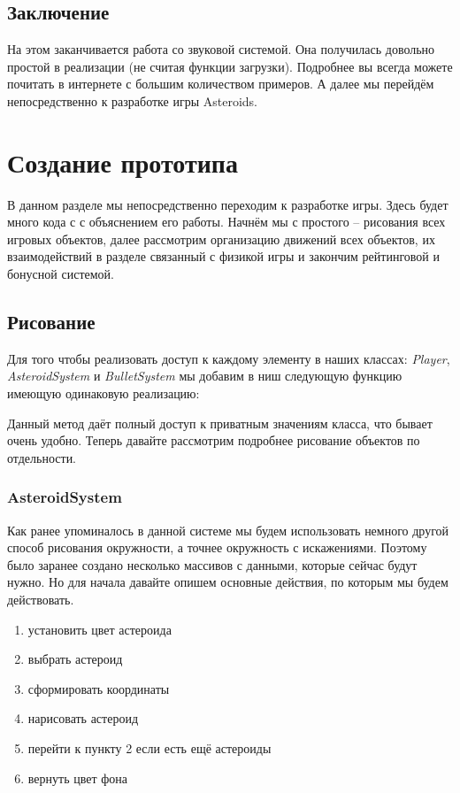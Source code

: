 \section{Заключение}
На этом заканчивается работа со звуковой системой. Она получилась довольно простой в 
реализации (не считая функции загрузки). Подробнее вы всегда можете почитать в интернете 
с большим количеством примеров. А далее мы перейдём непосредственно к разработке игры 
Asteroids.

\chapter{Создание прототипа}
В данном разделе мы непосредственно переходим к разработке игры. Здесь будет много кода с 
с объяснением его работы. Начнём мы с простого -- рисования всех игровых объектов, далее 
рассмотрим организацию движений всех объектов, их взаимодействий в разделе связанный с 
физикой игры и закончим рейтинговой и бонусной системой. 

\section{Рисование}
Для того чтобы реализовать доступ к каждому элементу в наших классах: \emph{Player}, 
\emph{AsteroidSystem} и \emph{BulletSystem} мы добавим в ниш следующую функцию имеющую 
одинаковую реализацию:


Данный метод даёт полный доступ к приватным значениям класса, что бывает очень удобно. 
Теперь давайте рассмотрим подробнее рисование объектов по отдельности.

\subsection{AsteroidSystem}
Как ранее упоминалось в данной системе мы будем использовать немного другой способ рисования 
окружности, а точнее окружность с искажениями. Поэтому было заранее создано несколько массивов 
с данными, которые сейчас будут нужно. Но для начала давайте опишем основные действия, по 
которым мы будем действовать.
\begin{enumerate}\itemsep-5pt
    \item установить цвет астероида
    \item выбрать астероид
    \item сформировать координаты
    \item нарисовать астероид
    \item перейти к пункту 2 если есть ещё астероиды
    \item вернуть цвет фона
\end{enumerate}

